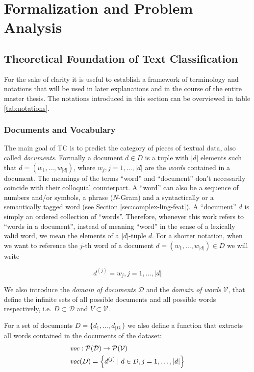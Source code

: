 \chapter{Formalization and Problem Analysis}
\label{ch:problem-analysis}

\section{Theoretical Foundation of Text Classification}

\label{sec:formalization}
For the sake of clarity it is useful to establish a framework of terminology and
notations that will be used in later explanations and in the course of
the entire master thesis. The notations introduced in this section can be
overviewed in table \ref{tab:notations}.

\subsection{Documents and Vocabulary}
The main goal of TC is to predict the category of pieces of textual data, also
called \emph{documents}.
Formally a document $d \in D$ is a tuple with $|d|$ elements such that
$d = (w_1,\ldots,w_{|d|})$, where $w_j, j=1,\ldots,|d|$ are the \emph{words}
contained in a document.
The meanings of the terms ``word'' and ``document'' don't necessarily coincide
with their colloquial counterpart. A ``word'' can also be a sequence of numbers
and/or symbols, a phrase ($N$-Gram) and a syntactically or a semantically tagged
word (see Section \ref{sec:complex-ling-feat}). A ``document'' $d$ is simply an
ordered collection of ``words''. 
Therefore, whenever this work refers to ``words in a document'', instead of
meaning ``word'' in the sense of a lexically valid word, we mean the elements
of a $|d|$-tuple $d$. For a shorter notation, when we want to
reference the $j$-th word of a document $d=(w_1,\ldots,w_{|d|}) \in D$ we will
write

\begin{equation*}
d^{(j)} = w_j, j=1,\ldots, |d|
\end{equation*}

We also introduce the \emph{domain of documents} $\mathcal{D}$ and the
\emph{domain of words} $\mathcal{V}$, that define the infinite sets of all possible
documents and all possible words respectively, i.e. $D \subset \mathcal{D}$ and $V \subset
\mathcal{V}$.

For a set of documents $D=\{d_1,\ldots,d_{|D|}\}$ we also define a
function that extracts all words contained in the documents of the dataset:
\begin{equation*}
\begin{split}
\mathit{voc}&: \mathcal{P}(\mathcal{D}) \to \mathcal{P}(\mathcal{V}) \\
\mathit{voc}&(D) = \left\{d^{(j)} \mid d \in D, j =
1,\ldots,|d|\right\}
\end{split}
\end{equation*}

